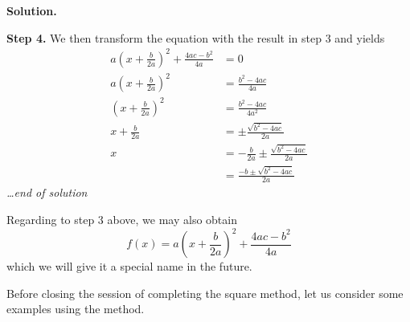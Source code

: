 \documentclass[12pt]{article}
\newenvironment{solution}{\begin{snugshade*} \textbf{Solution.} \par}{\hfill \textit{\dots end of solution} \end{snugshade*}}
\begin{document}
\begin{solution}
        \textbf{Step 4.} We then transform the equation with the result in step 3 and yields \begin{align*}
            a(x+\frac{b}{2a})^2+\frac{4ac-b^2}{4a}&=0\\
            a(x+\frac{b}{2a})^2&=\frac{b^2-4ac}{4a}\\
            (x+\frac{b}{2a})^2&=\frac{b^2-4ac}{4a^2}\\
            x+\frac{b}{2a}&=\pm\frac{\sqrt{b^2-4ac}}{2a}\\
            x&=-\frac{b}{2a}\pm\frac{\sqrt{b^2-4ac}}{2a}\\
            &=\frac{-b\pm \sqrt{b^2-4ac}}{2a}
        \end{align*}
    \end{solution}

    Regarding to step 3 above, we may also obtain \[f(x)=a(x+\frac{b}{2a})^2+\frac{4ac-b^2}{4a}\] which we will give it a special name in the future.

    Before closing the session of completing the square method, let us consider some examples using the method.
\end{document}
